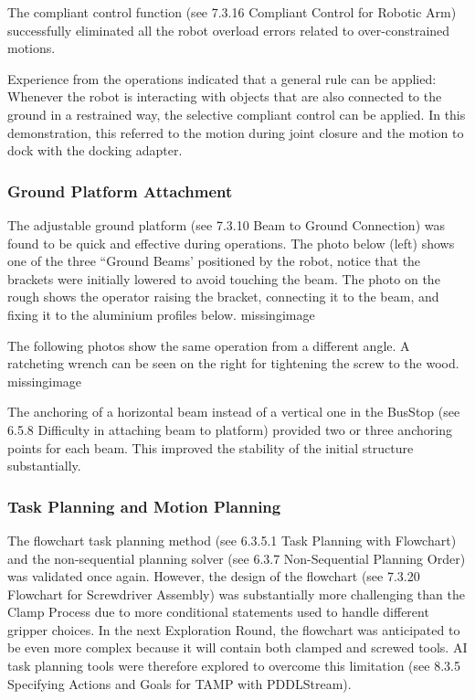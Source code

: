 The compliant control function (see 7.3.16 Compliant Control for Robotic Arm) successfully eliminated all the robot overload errors related to over-constrained motions. 

Experience from the operations indicated that a general rule can be applied: Whenever the robot is interacting with objects that are also connected to the ground in a restrained way, the selective compliant control can be applied. In this demonstration, this referred to the motion during joint closure and the motion to dock with the docking adapter.

\subsubsection{Ground Platform Attachment}
\label{subsubsection:exploration_4_ground_platform_attachment}

The adjustable ground platform (see 7.3.10 Beam to Ground Connection) was found to be quick and effective during operations. The photo below (left) shows one of the three “Ground Beams' positioned by the robot, notice that the brackets were initially lowered to avoid touching the beam. The photo on the rough shows the operator raising the bracket, connecting it to the beam, and fixing it to the aluminium profiles below.
missingimage

The following photos show the same operation from a different angle. A ratcheting wrench can be seen on the right for tightening the screw to the wood.
missingimage

The anchoring of a horizontal beam instead of a vertical one in the BusStop (see 6.5.8 Difficulty in attaching beam to platform) provided two or three anchoring points for each beam. This improved the stability of the initial structure substantially.

\subsubsection{Task Planning and Motion Planning}
\label{subsubsection:exploration_4_task_planning_and_motion_planning}

The flowchart task planning method (see 6.3.5.1 Task Planning with Flowchart) and the non-sequential planning solver (see 6.3.7 Non-Sequential Planning Order) was validated once again. However, the design of the flowchart (see 7.3.20 Flowchart for Screwdriver Assembly) was substantially more challenging than the Clamp Process due to more conditional statements used to handle different gripper choices. 
In the next Exploration Round, the flowchart was anticipated to be even more complex because it will contain both clamped and screwed tools. AI task planning tools were therefore explored to overcome this limitation (see 8.3.5 Specifying Actions and Goals for TAMP with PDDLStream). 

